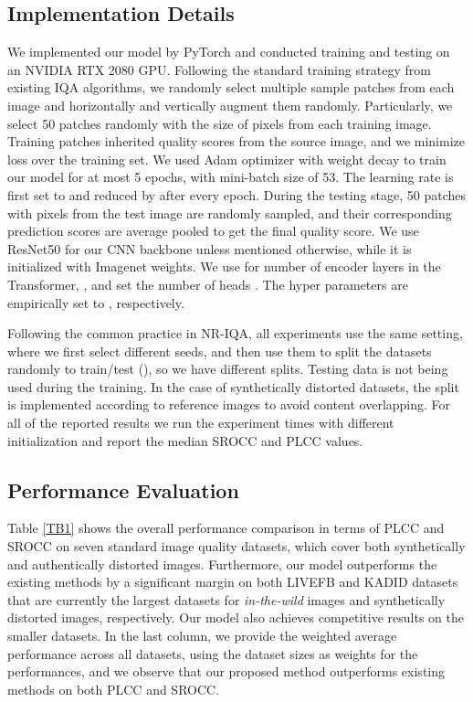 \documentclass[10pt,twocolumn,letterpaper]{article}
\begin{document}
\subsection{Implementation Details}
We implemented our model by PyTorch and conducted training and testing on an NVIDIA RTX 2080 GPU. Following the standard training strategy from existing IQA algorithms, we randomly select multiple sample patches from each image and horizontally and vertically augment them randomly. 
Particularly, we select 50 patches randomly with the size of  pixels from each training image. 
Training patches inherited quality scores from the source image, and we minimize  loss over the training set.
We used Adam \cite{kingma2014adam} optimizer with weight decay  to train our model for at most 5 epochs, with mini-batch size of 53. 
The learning rate is first set to   and reduced by  after every  epoch.
During the testing stage, 50 patches with  pixels from the test image are randomly sampled, and their corresponding prediction scores are average pooled to get the final quality score.
We use ResNet50 \cite{he2016deep} for our CNN backbone  unless mentioned otherwise, while it is initialized with Imagenet weights.
We use  for number of encoder layers in the Transformer, , and set the number of heads .
The hyper parameters  are empirically set to  , respectively.

Following the common practice in NR-IQA,   all experiments use the same setting,  where we first select  different seeds, and  then  use  them  to  split  the  datasets  randomly  to train/test (),  so we have  different splits.   Testing data is not being used during the training.
In the case of synthetically distorted datasets, the split is implemented according to reference images to avoid content overlapping. 
For all of the reported results we
run the experiment  times with different  initialization and report the median SROCC and PLCC values.


\subsection{Performance Evaluation}
Table \ref{TB1} shows the overall performance comparison in terms of PLCC and SROCC on seven standard image quality datasets, which cover both synthetically and authentically distorted images. 
Furthermore, our model outperforms the existing methods by a significant margin on both LIVEFB and KADID  datasets that are currently the largest datasets for \textit{in-the-wild} images and synthetically distorted images, respectively.
Our model also achieves  competitive results on the smaller datasets.
In the last column, we provide the weighted average  performance across all datasets, using the dataset sizes as  weights for the performances, and we observe that our proposed method outperforms existing methods on both PLCC and SROCC.
\end{document}
